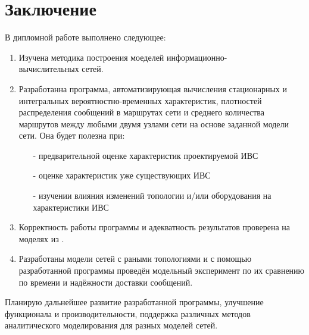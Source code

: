 \documentclass[oneside, draft, 14pt, a4paper]{extreport}
\begin{document}
\chapter*{\centering Заключение}
В дипломной работе выполнено следующее:	
\begin{enumerate}
	\item Изучена методика построения моеделей информационно- \\ вычислительных сетей.
	 
	\item Разработанна программа, автоматизирующая вычисления стационарных и интегральных вероятностно-временных характеристик, плотностей распределения сообщений в маршрутах сети и среднего количества маршрутов между любыми двумя узлами сети на основе заданной модели сети.
	Она будет полезна при:
	\begin{itemize}
		\item[-] предварительной оценке характеристик проектируемой ИВС
		\item[-] оценке характеристик уже существующих ИВС
		\item[-] изучении влияния изменений топологии и/или оборудования на характеристики ИВС
	\end{itemize}
	
	\item Корректность работы программы и адекватность результатов проверена на моделях из \cite{klimanov:manual_stankin}.
	
	\item Разработаны модели сетей с раными топологиями и с помощью разработанной программы проведён модельный эксперимент по их сравнению по времени и надёжности доставки сообщений.
\end{enumerate}

Планирую дальнейшее развитие разработанной программы, улучшение функционала и производительности, поддержка различных методов аналитического моделирования для разных моделей сетей.
\end{document}
